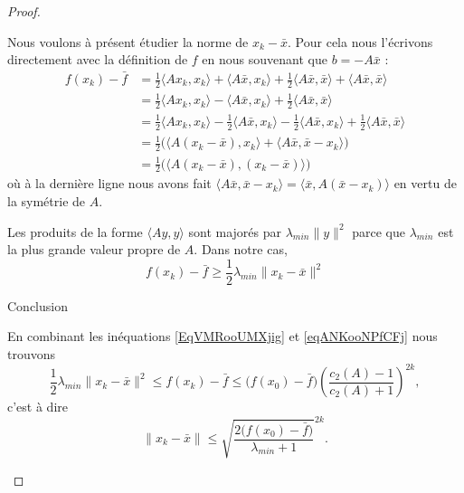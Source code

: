 \begin{proof}
\begin{subproof}
            Nous voulons à présent étudier la norme de \( x_k-\bar x\). Pour cela nous l'écrivons directement avec la définition de \( f\) en nous souvenant que \( b=-A\bar x\) :
            \begin{subequations}
                \begin{align}
                    f(x_k)-\bar f&=\frac{ 1 }{2}\langle Ax_k, x_k\rangle +\langle A\bar x, x_k\rangle +\frac{ 1 }{2}\langle A\bar x, \bar x\rangle +\langle A\bar x, \bar x\rangle \\
                    &=\frac{ 1 }{2}\langle Ax_k, x_k\rangle -\langle A\bar x, x_k\rangle +\frac{ 1 }{2}\langle A\bar x, \bar x\rangle \\
                    &=\frac{ 1 }{2}\langle Ax_k, x_k\rangle -\frac{ 1 }{2}\langle A\bar x, x_k\rangle-\frac{ 1 }{2}\langle A\bar x, x_k\rangle +\frac{ 1 }{2}\langle A\bar x, \bar x\rangle \\
                    &=\frac{ 1 }{2}\Big( \langle A(x_k-\bar x), x_k\rangle +\langle A\bar x, \bar x-x_k\rangle  \Big)\\
                    &=\frac{ 1 }{2}\Big( \langle A(x_k-\bar x), (x_k-\bar x)\rangle  \Big)
                \end{align}
            \end{subequations}
            où à la dernière ligne nous avons fait \( \langle A\bar x, \bar x-x_k\rangle =\langle \bar x, A(\bar x-x_k)\rangle \) en vertu de la symétrie de \( A\).

            Les produits de la forme \( \langle Ay, y\rangle \) sont majorés par \( \lambda_{min}\| y \|^2\) parce que \( \lambda_{min}\) est la plus grande valeur propre de \( A\). Dans notre cas,
            \begin{equation}    \label{EqVMRooUMXjig}
                f(x_k)-\bar f\geq \frac{ 1 }{2}\lambda_{min}\| x_k-\bar x \|^2
            \end{equation}
            
        \item[Conclusion]

            En combinant les inéquations \eqref{EqVMRooUMXjig} et \eqref{eqANKooNPfCFj} nous trouvons
            \begin{equation}
                \frac{ 1 }{2}\lambda_{min}\| x_k-\bar x \|^2\leq f(x_k)-\bar f\leq \big( f(x_0)-\bar f \big)\left( \frac{ c_2(A)-1 }{ c_2(A)+1 } \right)^{2k}, 
            \end{equation}
            c'est à dire
            \begin{equation}
                \| x_k-\bar x \|\leq \sqrt{\frac{ 2\big( f(x_0)-\bar f \big) }{ \lambda_{min} +1}}^{2k}.
            \end{equation}
    \end{subproof}
\end{proof}

